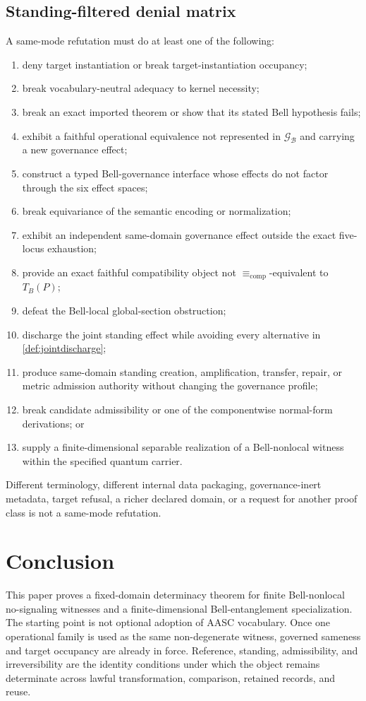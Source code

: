 \documentclass[11pt]{article}
\theoremstyle{definition}
\newcommand{\Bell}{\mathcal{B}}
\newcommand{\BellLaw}{\mathscr{G}_{\Bell}}
\newcommand{\CompEq}{\equiv_{\mathrm{comp}}}
\begin{document}
\subsection{Standing-filtered denial matrix}
A same-mode refutation must do at least one of the following:
\begin{enumerate}[label=(D\arabic*),leftmargin=3em]
\item deny target instantiation or break target-instantiation occupancy;
\item break vocabulary-neutral adequacy to kernel necessity;
\item break an exact imported theorem or show that its stated Bell hypothesis fails;
\item exhibit a faithful operational equivalence not represented in $\BellLaw$ and carrying a new governance effect;
\item construct a typed Bell-governance interface whose effects do not factor through the six effect spaces;
\item break equivariance of the semantic encoding or normalization;
\item exhibit an independent same-domain governance effect outside the exact five-locus exhaustion;
\item provide an exact faithful compatibility object not $\CompEq$-equivalent to $T_B(P)$;
\item defeat the Bell-local global-section obstruction;
\item discharge the joint standing effect while avoiding every alternative in \cref{def:jointdischarge};
\item produce same-domain standing creation, amplification, transfer, repair, or metric admission authority without changing the governance profile;
\item break candidate admissibility or one of the componentwise normal-form derivations; or
\item supply a finite-dimensional separable realization of a Bell-nonlocal witness within the specified quantum carrier.
\end{enumerate}
Different terminology, different internal data packaging, governance-inert metadata, target refusal, a richer declared domain, or a request for another proof class is not a same-mode refutation.

\section{Conclusion}\label{sec:conclusion}
This paper proves a fixed-domain determinacy theorem for finite Bell-nonlocal no-signaling witnesses and a finite-dimensional Bell-entanglement specialization. The starting point is not optional adoption of AASC vocabulary. Once one operational family is used as the same non-degenerate witness, governed sameness and target occupancy are already in force. Reference, standing, admissibility, and irreversibility are the identity conditions under which the object remains determinate across lawful transformation, comparison, retained records, and reuse.
\end{document}
